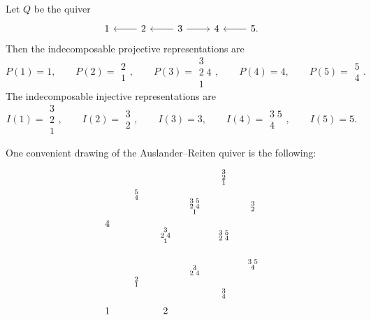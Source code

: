\documentclass[11pt, a4paper]{report}
\begin{document}
    \begin{example}
    Let \(Q\) be the quiver
    \[
    \begin{tikzcd}
    1 & 2 \arrow[l] & 3 \arrow[l] \arrow[r] & 4 & 5 \arrow[l].
    \end{tikzcd}
    \]
    Then the indecomposable projective representations are
    \[
        P(1)=1,
        \qquad
        P(2)=\substack{2\\1},
        \qquad
        P(3)=\substack{3\\2\;4\\1},
        \qquad
        P(4)=4,
        \qquad
        P(5)=\substack{5\\4}.
    \]
    The indecomposable injective representations are
    \[
        I(1)=\substack{3\\2\\1},
        \qquad
        I(2)=\substack{3\\2},
        \qquad
        I(3)=3,
        \qquad
        I(4)=\substack{3\;5\\4},
        \qquad
        I(5)=5.
    \]

    One convenient drawing of the Auslander--Reiten quiver is the following:
    \[
    \begin{tikzpicture}[scale=1.05,>=stealth]
    \node (a11) at (0,0) {$1$};
    \node (a44) at (0,3) {$4$};

    \node (a12) at (1,1) {$\substack{2\\1}$};
    \node (a45) at (1,4) {$\substack{5\\4}$};

    \node (a14) at (2,2.6) {$\substack{3\\2\;4\\1}$};
    \node (a22) at (2,0) {$2$};

    \node (a15) at (3,3.6) {$\substack{3\;5\\2\;4\\1}$};
    \node (a24) at (3,1.4) {$\substack{3\\2\;4}$};

    \node (a13) at (4,4.6) {$\substack{3\\2\\1}$};
    \node (a25) at (4,2.6) {$\substack{3\;5\\2\;4}$};
    \node (a34) at (4,0.6) {$\substack{3\\4}$};

    \node (a23) at (5,3.6) {$\substack{3\\2}$};
    \node (a35) at (5,1.6) {$\substack{3\;5\\4}$};


\end{tikzpicture}\]
\end{example}
\end{document}
